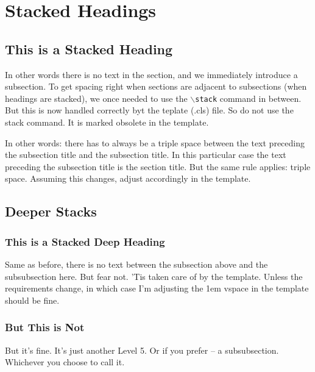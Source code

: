 \section{Stacked Headings}


\subsection{This is a Stacked Heading}
In other words there is no text in the section, and we immediately introduce a subsection.
To get spacing right when sections are adjacent to subsections (when headings are stacked),
we once needed to use the \texttt{$\backslash$stack} command in between.
But this is now handled correctly byt the teplate (.cls) file. So do not use the stack command.
It is marked obsolete in the template.

In other words: there has to always be a triple space between the text preceding the subsection title and the subsection title.
In this particular case the text preceding the subsection title is the section title.
But the same rule applies: triple space.
Assuming this changes, adjust accordingly in the template.

\subsection{Deeper Stacks}


\subsubsection{This is a Stacked Deep Heading}
Same as before, there is no text between the subsection above and the subsubsection here.
But fear not. 'Tis taken care of by the template.
Unless the requirements change, in which case I'm adjusting the 1em vspace in the template should be fine.

\subsubsection{But This is Not}
But it's fine. It's just another Level 5. Or if you prefer -- a subsubsection. Whichever you choose to call it.
